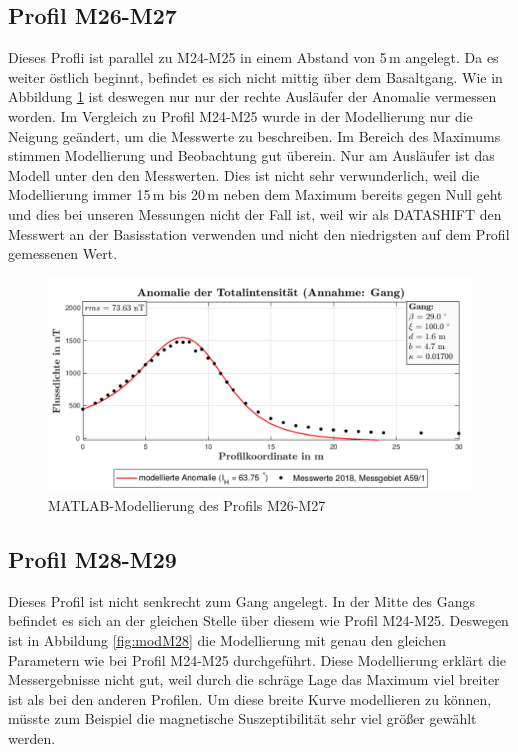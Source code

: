 \subsection{Profil M26-M27}

Dieses Profli ist parallel zu M24-M25 in einem Abstand von 5\,m angelegt. Da es weiter östlich beginnt, befindet es sich nicht mittig über dem Basaltgang. Wie in Abbildung \ref{fig:modM26} ist deswegen nur nur der rechte Ausläufer der Anomalie vermessen worden. Im Vergleich zu Profil M24-M25 wurde in der Modellierung nur die Neigung geändert, um die Messwerte zu beschreiben. Im Bereich des Maximums stimmen Modellierung und Beobachtung gut überein. Nur am Ausläufer ist das Modell unter den den Messwerten. Dies ist nicht sehr verwunderlich, weil die Modellierung immer 15\,m bis 20\,m neben dem Maximum bereits gegen Null geht und dies bei unseren Messungen nicht der Fall ist, weil wir als DATASHIFT den Messwert an der Basisstation verwenden und nicht den niedrigsten auf dem Profil gemessenen Wert.

\begin{figure}
 \centering
 \includegraphics[width=\textwidth]{fig/modM26}
 \caption{MATLAB-Modellierung des Profils M26-M27}
 \label{fig:modM26}
\end{figure}

\subsection{Profil M28-M29}

Dieses Profil ist nicht senkrecht zum Gang angelegt. In der Mitte des Gangs befindet es sich an der gleichen Stelle über diesem wie Profil M24-M25. Deswegen ist in Abbildung \ref{fig:modM28} die Modellierung mit genau den gleichen Parametern wie bei Profil M24-M25 durchgeführt. Diese Modellierung erklärt die Messergebnisse nicht gut, weil durch die schräge Lage das Maximum viel breiter ist als bei den anderen Profilen. Um diese breite Kurve modellieren zu können, müsste zum Beispiel die magnetische Suszeptibilität sehr viel größer gewählt werden.

